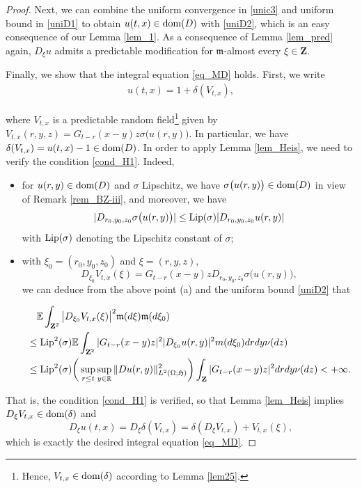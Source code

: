 \documentclass[letterpaper, 11pt,  reqno]{amsart}
\newcommand{\noi}{\noindent}
\newcommand{\R}{\mathbb{R}}
\newcommand{\E}{\mathbb{E}}
\newcommand{\dl}{\delta}
\newcommand{\s}{\sigma}
\renewcommand{\O}{\Omega}
\newcommand{\fm}{\mathfrak{m}}
\newcommand{\fH}{\mathfrak{H}}
\newcommand{\dom}{\textup{dom}}
\numberwithin{equation}{section}
\numberwithin{theorem}{section}
\begin{document}
\begin{proof}
 
Next,  we can combine the uniform convergence  in \eqref{unic3} 
and uniform bound in \eqref{uniD1}
to obtain  $u(t,x)\in \dom(D)$ with \eqref{uniD2},
which is an easy  consequence of our Lemma \ref{lem_1}. 
As a consequence of Lemma \ref{lem_pred} again, 
$D_\xi u$ admits a predictable modification for $\fm$-almost every $\xi\in\mathbf{Z}$.

\smallskip

Finally, we   show that the integral equation \eqref{eq_MD} holds. 
First, we write 
\begin{align}\label{eq_u}
u(t,x) = 1 + \dl( V_{t,x}),
\end{align}

\noi
where $V_{t,x}$ is a predictable random field\footnote{Hence, $V_{t,x}\in \dom(\dl)$ 
according to Lemma \ref{lem25}.}
given by $V_{t,x}(r, y, z) = G_{t-r}(x-y)z \s\big( u(r, y) \big)$. In particular, 
we have $\dl( V_{t,x}) = u(t,x) - 1\in \dom(D)$. In order to apply Lemma \ref{lem_Heis},
we need to verify the condition \eqref{cond_H1}.
Indeed, 
\begin{itemize}
\item[(a)] for $u(r,y)\in\dom(D)$ and $\s$ Lipschitz, we have 
$ \s\big( u(r, y) \big)\in\dom(D)$ in view of Remark \ref{rem_BZ-iii},
and moreover, we have 
\[
| D_{r_0, y_0, z_0} \s\big( u(r, y) \big) | \leq \textup{Lip}(\s) | D_{r_0, y_0, z_0} u(r, y) |
\]
with $ \textup{Lip}(\s) $ denoting the Lipschitz constant of $\s$;


\item[(b)]

 with $\xi_0 = (r_0, y_0,z_0)$ and $\xi = (r, y, z)$,
\[
D_{\xi_0} V_{t,x}(\xi) = G_{t-r}(x-y)z D_{r_0, y_0, z_0} \s\big( u(r, y) \big),
\]
we can deduce from the above point (a) and the uniform bound \eqref{uniD2}
that 

\noi
\begin{align} \notag%
\begin{aligned} 
&\quad \E\int_{\mathbf{Z}^2} \big| D_{\xi_0} V_{t,x}(\xi) \big|^2 \fm(d\xi) \fm(d\xi_0)  \\
&\leq   \textup{Lip}^2(\s) 
\E  \int_{\mathbf{Z}^2} | G_{t-r}(x-y)z  |^2  | D_{\xi_0}  u(r, y) |^2 m(d\xi_0) drdy \nu(dz) \\
&\leq   \textup{Lip}^2(\s)  \bigg( \sup_{r\leq t} \sup_{y\in\R}  \| D u(r, y) \|^2_{L^2(\O;\fH)} \bigg)
\int_{\mathbf{Z}} | G_{t-r}(x-y)z  |^2 drdy \nu(dz)
 < +\infty .
\end{aligned}
\end{align}

\end{itemize}
That is, the condition \eqref{cond_H1} is   verified, so that 
Lemma \ref{lem_Heis} implies   
$D_{\xi} V_{t,x}\in \dom(\dl)$ and 
\[
D_{\xi} u(t,x) = D_{\xi} \dl( V_{t,x}) = \dl (D_{\xi} V_{t,x}  ) + V_{t,x}(\xi),
\]
which is exactly the desired integral equation \eqref{eq_MD}.
\qedhere



\end{proof}
\end{document}
